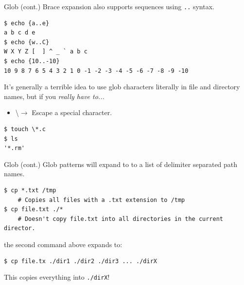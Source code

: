 \documentclass[11pt]{beamer}
\begin{document}
\begin{frame}[fragile=singleslide]{Glob (cont.)}
Brace expansion also supports sequences using \texttt{..} syntax.
\begin{lstlisting}[style=terminal]
$ echo {a..e}
a b c d e
$ echo {w..C}
W X Y Z [  ] ^ _ ` a b c
$ echo {10..-10}
10 9 8 7 6 5 4 3 2 1 0 -1 -2 -3 -4 -5 -6 -7 -8 -9 -10
\end{lstlisting}

It's generally a terrible idea to use glob characters literally in file and directory names, but if you \emph{really have to...}
\begin{itemize}
\item \textbackslash $\rightarrow$ Escape a special character.  
\end{itemize}
\begin{lstlisting}[style=terminal]
$ touch \*.c 
$ ls 
'*.rm'
\end{lstlisting}
\end{frame}

\begin{frame}[fragile=singleslide]{Glob (cont.)}
Glob patterns will expand to to a list of delimiter separated path names.
\begin{lstlisting}[style=terminal]
$ cp *.txt /tmp
	# Copies all files with a .txt extension to /tmp
$ cp file.txt ./*
	# Doesn't copy file.txt into all directories in the current director.
\end{lstlisting}
the second command above expands to:
\begin{lstlisting}[style=terminal]
$ cp file.tx ./dir1 ./dir2 ./dir3 ... ./dirX
\end{lstlisting}
This copies everything into \texttt{./dirX}!  
\end{frame}
\end{document}
